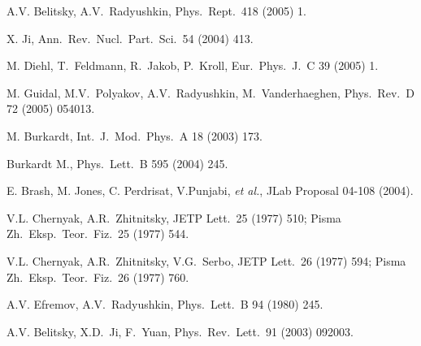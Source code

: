 \begin{thebibliography}{PPV06}
A.V. Belitsky, A.V.~Radyushkin,
  Phys.\ Rept.\   418 (2005) 1.

 X. Ji,
  Ann.\ Rev.\ Nucl.\ Part.\ Sci.\   54 (2004) 413.

  M. Diehl, T.~Feldmann, R.~Jakob, P.~Kroll,
  Eur.\ Phys.\ J.\ C  39 (2005) 1.

  M. Guidal, M.V.~Polyakov, A.V.~Radyushkin, M.~Vanderhaeghen,
  Phys.\ Rev.\ D  72 (2005) 054013.

M. Burkardt,
Int.\ J.\ Mod.\ Phys.\ A  18 (2003) 173.

Burkardt M.,
Phys.\ Lett.\ B  595 (2004) 245.

E. Brash, M. Jones, C. Perdrisat, V.Punjabi, {\it et al.}, JLab Proposal 04-108 (2004).

  V.L. Chernyak, A.R.~Zhitnitsky,
  JETP Lett.\   25 (1977) 510; Pisma Zh.\ Eksp.\ Teor.\ Fiz.\   25 (1977) 544.


  V.L. Chernyak, A.R.~Zhitnitsky, V.G.~Serbo,
  JETP Lett.\   26   (1977) 594; Pisma Zh.\ Eksp.\ Teor.\ Fiz.\   26 (1977) 760.

  A.V. Efremov, A.V.~Radyushkin,
  Phys.\ Lett.\ B  94 (1980) 245.

A.V. Belitsky, X.D.~Ji, F.~Yuan,
  Phys.\ Rev.\ Lett.\  91 (2003) 092003.


\end{thebibliography}
